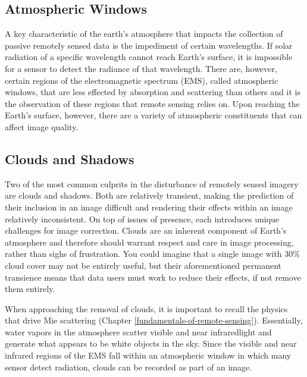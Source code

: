 \documentclass[
]{book}
\begin{document}
\subsection{Atmospheric Windows}\label{atmospheric-windows}

A key characteristic of the earth's atmosphere that impacts the collection of passive remotely sensed data is the impediment of certain wavelengths. If solar radiation of a specific wavelength cannot reach Earth's surface, it is impossible for a sensor to detect the radiance of that wavelength. There are, however, certain regions of the electromagnetic spectrum (EMS), called atmospheric windows, that are less effected by absorption and scattering than others and it is the observation of these regions that remote sensing relies on. Upon reaching the Earth's surface, however, there are a variety of atmospheric constituents that can affect image quality.

\subsection{Clouds and Shadows}\label{clouds-and-shadows}

Two of the most common culprits in the disturbance of remotely sensed imagery are clouds and shadows. Both are relatively transient, making the prediction of their inclusion in an image difficult and rendering their effects within an image relatively inconsistent. On top of issues of presence, each introduces unique challenges for image correction. Clouds are an inherent component of Earth's atmosphere and therefore should warrant respect and care in image processing, rather than sighs of frustration. You could imagine that a single image with 30\% cloud cover may not be entirely useful, but their aforementioned permanent transience means that data users must work to reduce their effects, if not remove them entirely.

When approaching the removal of clouds, it is important to recall the physics that drive Mie scattering (Chapter \ref{fundamentals-of-remote-sensing}). Essentially, water vapors in the atmosphere scatter visible and near infraredlight and generate what appears to be white objects in the sky. Since the visible and near infrared regions of the EMS fall within an atmospheric window in which many sensor detect radiation, clouds can be recorded as part of an image.
\end{document}
